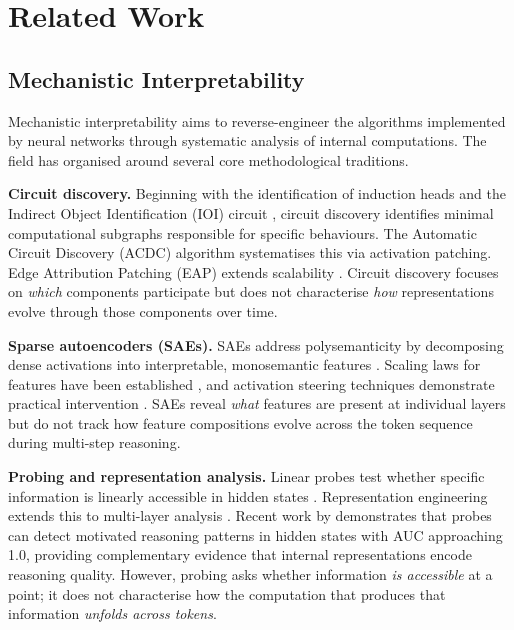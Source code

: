 \documentclass[11pt,twocolumn]{article}
\begin{document}
\section{Related Work}
\label{sec:related}

\subsection{Mechanistic Interpretability}

Mechanistic interpretability aims to reverse-engineer the algorithms implemented by neural networks through systematic analysis of internal computations. The field has organised around several core methodological traditions.

\textbf{Circuit discovery.} Beginning with the identification of induction heads \citep{olsson2022context} and the Indirect Object Identification (IOI) circuit \citep{wang2022interpretability}, circuit discovery identifies minimal computational subgraphs responsible for specific behaviours. The Automatic Circuit Discovery (ACDC) algorithm \citep{conmy2023acdc} systematises this via activation patching. Edge Attribution Patching (EAP) extends scalability \citep{syed2023attribution}. Circuit discovery focuses on \emph{which} components participate but does not characterise \emph{how} representations evolve through those components over time.

\textbf{Sparse autoencoders (SAEs).} SAEs address polysemanticity by decomposing dense activations into interpretable, monosemantic features \citep{bricken2023monosemanticity, cunningham2023sparse}. Scaling laws for features have been established \citep{templeton2024scaling}, and activation steering techniques demonstrate practical intervention \citep{turner2023activation}. SAEs reveal \emph{what} features are present at individual layers but do not track how feature compositions evolve across the token sequence during multi-step reasoning.

\textbf{Probing and representation analysis.} Linear probes test whether specific information is linearly accessible in hidden states \citep{belinkov2022probing, li2024inference}. Representation engineering extends this to multi-layer analysis \citep{zou2023representation}. Recent work by \citet{mirtaheri2025motivated} demonstrates that probes can detect motivated reasoning patterns in hidden states with AUC approaching 1.0, providing complementary evidence that internal representations encode reasoning quality. However, probing asks whether information \emph{is accessible} at a point; it does not characterise how the computation that produces that information \emph{unfolds across tokens}.
\end{document}
